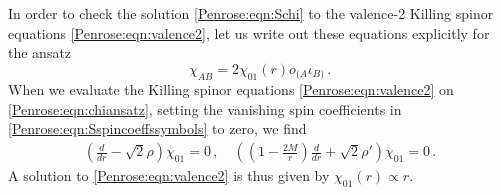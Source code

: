 In order to check the solution \eqref{Penrose:eqn:Schi} to the valence-2 Killing spinor equations \eqref{Penrose:eqn:valence2}, let us write out these equations explicitly for the ansatz
\begin{equation}\label{Penrose:eqn:chiansatz}
\chi_{AB} = 2 \chi_{01}(r) o_{(A} \iota_{B)} \, .
\end{equation}
When we evaluate the Killing spinor equations \eqref{Penrose:eqn:valence2} on \eqref{Penrose:eqn:chiansatz}, setting the vanishing spin coefficients in \eqref{Penrose:eqn:Sspincoeffssymbols} to zero, we find
\begin{equation}\label{Penrose:eqn:S2killingeqn}
\begin{aligned}
\left(\frac{d}{dr} - \sqrt{2}\rho\right)\chi_{01} = 0  \, , \quad \left(\left(1-\frac{2M}{r}\right)\frac{d}{dr} + \sqrt{2} \rho'\right)\chi_{01} = 0 \, .
\end{aligned}
\end{equation}
A solution to  \eqref{Penrose:eqn:valence2} is thus given by $\chi_{01}(r) \propto r$. 

